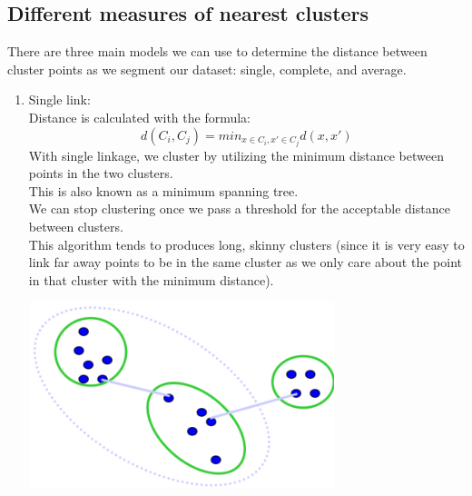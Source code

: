 \documentclass{article}
\begin{document}
\subsection{Different measures of nearest clusters}
There are three main models we can use to determine the distance between cluster points as we segment our dataset: single, complete, and average.

\begin{enumerate}
	\item Single link:\\
	Distance is calculated with the formula:
	\begin{equation}
	    d(C_i,C_j) = min_{x \in C_i,x' \in C_j}d(x,x')
    \end{equation}
    With single linkage, we cluster by utilizing the minimum distance between points in the two clusters.\\
    This is also known as a minimum spanning tree.\\
    We can stop clustering once we pass a threshold for the acceptable distance between clusters.\\
    This algorithm tends to produces long, skinny clusters (since it is very easy to link far away points to be in the same cluster as we only care about the point in that cluster with the minimum distance).
    \begin{center}
        \includegraphics[width=0.70\textwidth]{single.png}
    \end{center}


\end{enumerate}
\end{document}
